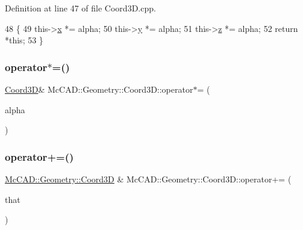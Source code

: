 Definition at line 47 of file Coord3\+D.\+cpp.


\begin{DoxyCode}
48                                 \{
49     this->\hyperlink{classMcCAD_1_1Geometry_1_1Coord3D_a82467d541e4e330484b7f4d589b433b4}{x} *= alpha;
50     this->\hyperlink{classMcCAD_1_1Geometry_1_1Coord3D_af6512434da6e0242b2606e2341abc01d}{y} *= alpha;
51     this->\hyperlink{classMcCAD_1_1Geometry_1_1Coord3D_a5f89140bda6825a0a21d0064d05d9f4b}{z} *= alpha;
52     \textcolor{keywordflow}{return} *\textcolor{keyword}{this};
53 \}
\end{DoxyCode}
\mbox{\label{classMcCAD_1_1Geometry_1_1Coord3D_a16e9d49b3182dc86a032afd3b3d47551}} 
\subsubsection{\texorpdfstring{operator$\ast$=()}{operator*=()}\hspace{0.1cm}{\footnotesize\ttfamily [2/2]}}
{\footnotesize\ttfamily \hyperlink{classMcCAD_1_1Geometry_1_1Coord3D}{Coord3D}\& Mc\+C\+A\+D\+::\+Geometry\+::\+Coord3\+D\+::operator$\ast$= (\begin{DoxyParamCaption}\item[{const \hyperlink{namespaceMcCAD_1_1Geometry_ac043b37a4a7e849fca22869e1982d2f8}{coord\+\_\+type} \&}]{alpha }\end{DoxyParamCaption})}

\mbox{\label{classMcCAD_1_1Geometry_1_1Coord3D_ab0e75167511fbb0704e10ece3cafe056}} 
\subsubsection{\texorpdfstring{operator+=()}{operator+=()}\hspace{0.1cm}{\footnotesize\ttfamily [1/2]}}
{\footnotesize\ttfamily \hyperlink{classMcCAD_1_1Geometry_1_1Coord3D}{Mc\+C\+A\+D\+::\+Geometry\+::\+Coord3D} \& Mc\+C\+A\+D\+::\+Geometry\+::\+Coord3\+D\+::operator+= (\begin{DoxyParamCaption}\item[{const \hyperlink{classMcCAD_1_1Geometry_1_1Coord3D}{Coord3D} \&}]{that }\end{DoxyParamCaption})}



